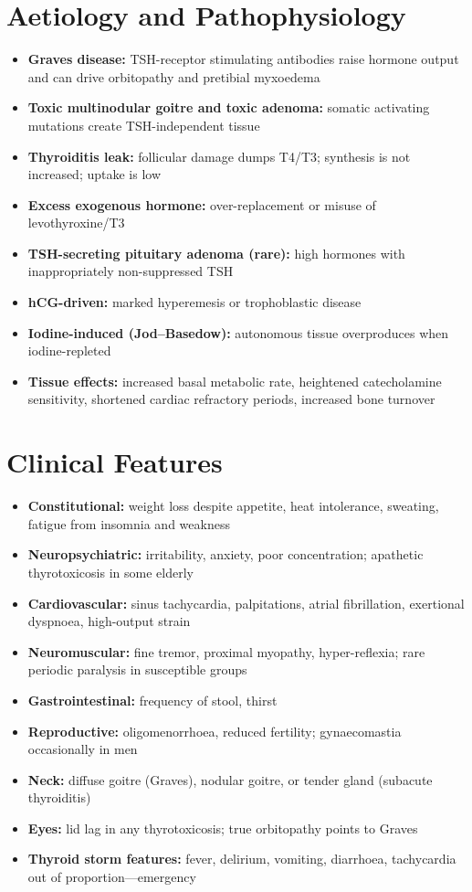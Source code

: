 \section*{Aetiology and Pathophysiology}
\begin{itemize}
    \item \textbf{Graves disease:} TSH-receptor stimulating antibodies raise hormone output and can drive orbitopathy and pretibial myxoedema
    \item \textbf{Toxic multinodular goitre and toxic adenoma:} somatic activating mutations create TSH-independent tissue
    \item \textbf{Thyroiditis leak:} follicular damage dumps T4/T3; synthesis is not increased; uptake is low
    \item \textbf{Excess exogenous hormone:} over-replacement or misuse of levothyroxine/T3
    \item \textbf{TSH-secreting pituitary adenoma (rare):} high hormones with inappropriately non-suppressed TSH
    \item \textbf{hCG-driven:} marked hyperemesis or trophoblastic disease
    \item \textbf{Iodine-induced (Jod--Basedow):} autonomous tissue overproduces when iodine-repleted
    \item \textbf{Tissue effects:} increased basal metabolic rate, heightened catecholamine sensitivity, shortened cardiac refractory periods, increased bone turnover
\end{itemize}

\section*{Clinical Features}
\begin{itemize}
    \item \textbf{Constitutional:} weight loss despite appetite, heat intolerance, sweating, fatigue from insomnia and weakness
    \item \textbf{Neuropsychiatric:} irritability, anxiety, poor concentration; apathetic thyrotoxicosis in some elderly
    \item \textbf{Cardiovascular:} sinus tachycardia, palpitations, atrial fibrillation, exertional dyspnoea, high-output strain
    \item \textbf{Neuromuscular:} fine tremor, proximal myopathy, hyper-reflexia; rare periodic paralysis in susceptible groups
    \item \textbf{Gastrointestinal:} frequency of stool, thirst
    \item \textbf{Reproductive:} oligomenorrhoea, reduced fertility; gynaecomastia occasionally in men
    \item \textbf{Neck:} diffuse goitre (Graves), nodular goitre, or tender gland (subacute thyroiditis)
    \item \textbf{Eyes:} lid lag in any thyrotoxicosis; true orbitopathy points to Graves
    \item \textbf{Thyroid storm features:} fever, delirium, vomiting, diarrhoea, tachycardia out of proportion---emergency
\end{itemize}

